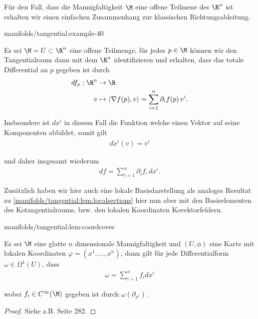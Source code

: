 \documentclass[letterpaper,10pt,german]{jupyterBook}
\begin{document}
\par
Für den Fall, dass die Mannigfaltigkeit \(\M\) eine offene Teilmene des \(\R^n\) ist erhalten wir einen einfachen Zusammenhang zur klassischen Richtungsableitung.
\begin{example}{}{manifolds/tangential:example-40}



\par
Es sei \(\M=U\subset\R^n\) eine offene Teilmenge, für jedes \(p\in\M\) können wir den Tangentialraum dann mit dem \(\R^n\) identifizieren und erhalten, dass das totale Differential an \(p\) gegeben ist durch
\begin{align*}
df_p:\R^n&\to\R\\
v&\mapsto \langle \nabla f(p), v \rangle = \sum_{i=1}^n \partial_i f(p)\, v^i.
\end{align*}
\par
Insbsondere ist \(dx^{i}\) in diesem Fall die Funktion welche einen Vektor auf seine Komponenten abbildet, somit gilt
\begin{align*}
dx^{i}(v) = v^i
\end{align*}
\par
und daher insgesamt wiederum
\begin{align*}
df = \sum_{i=1}^n \partial_i f, dx^{i}.
\end{align*}\end{example}

\par
Zusätzlich haben wir hier auch eine lokale Basisdarstellung als analoges Resultat zu \cref{manifolds/tangential:lem:localsections} hier nun aber mit den Basiselementen des Kotangentialraums, bzw. den lokalen Koordinaten Kovektorfeldern.
\begin{lemma}{}{manifolds/tangential:lem:coordcovec}



\par
Es sei \(\M\) eine glatte \(n\) dimensionale Mannigfaltigkeit und \((U,\phi)\) eine Karte mit lokalen Koordinaten \(\varphi=(x^1,\ldots, x^n)\),  dann gilt für jede Differentialform \(\omega\in\Omega^1(U)\), dass
\begin{align*}
\omega = \sum_{i=1}^n f_i dx^i
\end{align*}
\par
wobei \(f_i\in C^\infty(\M)\) gegeben ist durch \(\omega(\partial_{x^i})\).
\end{lemma}

\begin{proof}
 Siehe z.B. \cite{Lee03} Seite 282.
\end{proof}
\end{document}
